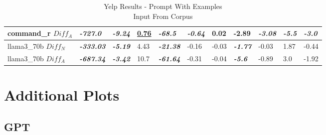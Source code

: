 \documentclass[11pt]{article}
\begin{document}
\begin{table}[!ht]
{\begin{tabular}{lllllllllll}
            command\_r $Diff_A$  & \textbf{\textit{-727.0}}  & \textbf{\textit{-9.24}} & \textbf{\underline{0.76}} & \textbf{\textit{-68.5}}  & \textbf{\textit{-0.64}} & 0.02        & -2.89                   & \textbf{\textit{-3.08}} & \textbf{\textit{-5.5}}  & \textbf{\textit{-3.0}}  \\ \midrule
            llama3\_70b $Diff_N$ & \textbf{\textit{-333.03}} & \textbf{\textit{-5.19}} & 4.43                      & \textbf{\textit{-21.38}} & -0.16                   & -0.03       & \textbf{\textit{-1.77}} & -0.03                   & 1.87                    & -0.44                   \\ \midrule
            llama3\_70b $Diff_A$ & \textbf{\textit{-687.34}} & \textbf{\textit{-3.42}} & 10.7                      & \textbf{\textit{-61.64}} & -0.31                   & -0.04       & \textbf{\textit{-5.6}}  & -0.89                   & 3.0                     & -1.92                   \\ \bottomrule
        \end{tabular}%
    }
    \caption{Yelp Results - Prompt With Examples\\Input From Corpus}\label{table-prompt-2-ifd-yelp}
\end{table}

\section{Additional Plots}

\subsection{GPT}
\end{document}
